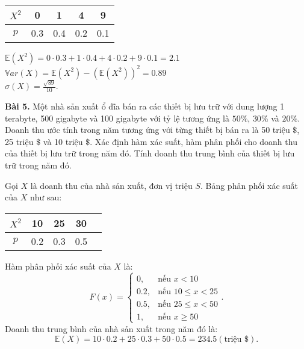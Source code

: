 \documentclass[12pt,a4paper]{article}
\begin{document}
\begin{table}[H]
    \begin{center}
        \begin{tabular}{|c|c|c|c|c|}
            \hline 
            $X^2$ & 0 & 1 & 4 & 9 \\ 
            \hline 
            $p$ & 0.3 & 0.4 & 0.2 & 0.1 \\ 
            \hline 
            \end{tabular} 
    \end{center}
\end{table}
$\mathbb{E} \left( {X^2} \right) = 0 \cdot 0.3 + 1 \cdot 0.4 + 4 \cdot 0.2 + 9 \cdot 0.1 = 2.1$\\
$\mathbb{V}ar \left( X \right) = \mathbb{E} \left( {X^2} \right) - \left( {\mathbb{E} \left( {X^2} \right)} \right)^2 = 0.89$\\
$\sigma \left( X \right) = \frac{\sqrt{89}}{10}.$


\begin{mybox}
    \textbf{Bài 5.} 
    Một  nhà  sản  xuất  ổ  đĩa  bán  ra  các  thiết  bị  lưu  trữ  với  dung  lượng  1  terabyte,  500 
    gigabyte và 100 gigabyte với tỷ lệ tương ứng là $50\%$, $30\%$ và $20\%$. Doanh thu ước tính trong năm tương 
    ứng với từng thiết bị bán ra là 50 triệu $\$$, 25 triệu $\$$ và 10 triệu $\$$. Xác định hàm xác suất, hàm 
    phân phối cho doanh thu của thiết bị lưu trữ trong năm đó. Tính doanh thu trung bình của thiết bị lưu trữ trong năm đó.  
\end{mybox}
Gọi $X$ là doanh thu của nhà sản xuất, đơn vị triệu $S$. Bảng phân phối xác suất của $X$ như sau:
\begin{table}[H]
    \begin{center}
        \begin{tabular}{|c|c|c|c|c|}
            \hline 
            $X^2$ & 10 & 25 & 30 \\ 
            \hline 
            $p$ & 0.2 & 0.3 & 0.5  \\ 
            \hline 
            \end{tabular} 
    \end{center}
\end{table}
Hàm phân phối xác suất của $X$ là:
$$F \left( x \right) = 
\begin{cases}
    0,&\text{nếu } x < 10\\
    0.2,&\text{nếu } 10 \leqslant x < 25\\
    0.5,&\text{nếu } 25 \leqslant x < 50\\
    1,&\text{nếu } x \geqslant 50
\end{cases}
.$$
Doanh thu trung bình của nhà sản xuất trong năm đó là:
$$\mathbb{E} \left( X \right) = 10 \cdot 0.2 + 25 \cdot 0.3 + 50 \cdot 0.5 = 234.5 \left( {\text{triệu } \$} \right).$$
\end{document}
